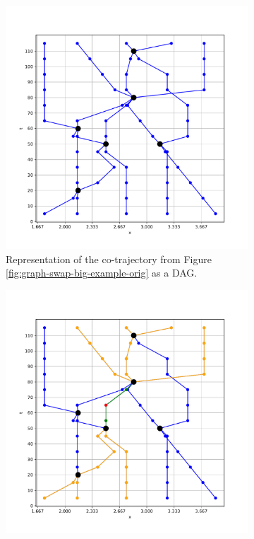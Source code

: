 \documentclass[12pt]{article}
\theoremstyle{definition}
\begin{document}
\begin{figure}
  \centering
  \begin{subfigure}[t]{0.49\textwidth}
    \includegraphics[width=\textwidth]{graph-swap-big-example-DAG.pdf}
    \caption{Representation of the co-trajectory from Figure
      \ref{fig:graph-swap-big-example-orig} as a DAG.}
    \label{fig:graph-swap-big-example-DAG}
  \end{subfigure}
  \begin{subfigure}[t]{0.49\textwidth}
    \includegraphics[width=\textwidth]{graph-swap-big-example-marked.pdf}

\end{subfigure}
\end{figure}
\end{document}
